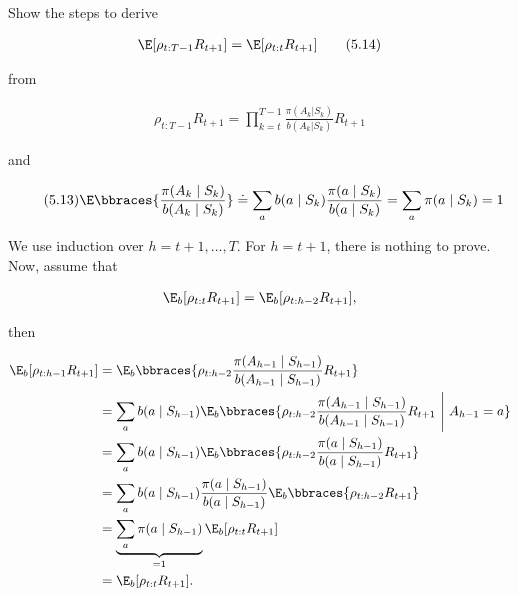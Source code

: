 
\begin{exercise}[Exercise 5.13]

Show the steps to derive

\begin{align*}
    \E[\rho_{t:T-1}R_{t+1}] = \E[\rho_{t:t}R_{t+1}] \tag{5.14}
\end{align*}

from

\begin{align*}
    \rho_{t:T-1}R_{t+1} = \prod_{k=t}^{T-1}\frac{\pi(A_k|S_k)}{b(A_k|S_k)}R_{t+1} \tag{5.12}
\end{align*}

and

\begin{align} \label{eq:5.13} \tag{5.13}
    \E\bbraces{\frac{\pi(A_k \mid S_k)}{b(A_k \mid S_k)}}
    \doteq \sum_a b(a \mid S_k) \frac{\pi(a \mid S_k)}{b(a \mid S_k)}
    = \sum_a \pi(a \mid S_k) = 1
\end{align}

\end{exercise}


\begin{solution}

We use induction over $h = t+1,\dots,T$.
For $h = t+1$, there is nothing to prove.
Now, assume that

\begin{align*}
    \E_b[\rho_{t:t} R_{t+1}]
    =
    \E_b[\rho_{t:h-2} R_{t+1}],
\end{align*}

then

\begin{align*}
    \E_b[\rho_{t:h-1} R_{t+1}]
    &= \E_b\bbraces{\rho_{t:h-2}
    \frac{\pi(A_{h-1} \mid S_{h-1})}{b(A_{h-1} \mid S_{h-1})}R_{t+1}} \\
    &= \sum_a b(a \mid S_{h-1})
    \E_b\bbraces{\rho_{t:h-2}\frac{\pi(A_{h-1} \mid S_{h-1})}
    {b(A_{h-1} \mid S_{h-1})}R_{t+1}~ \Bigg | ~ A_{h-1} = a} \\
    &= \sum_a b(a \mid S_{h-1}) \E_b\bbraces{
    \rho_{t:h-2}\frac{\pi(a \mid S_{h-1})}{b(a \mid S_{h-1})}R_{t+1}} \\            
    &= \sum_a b(a \mid S_{h-1})\frac{\pi(a \mid S_{h-1})}{b(a \mid S_{h-1})}
    \E_b\bbraces{\rho_{t:h-2}R_{t+1}} \\
    &= \underbrace{\sum_a \pi(a \mid S_{h-1})}_{=1}
    \E_b[\rho_{t:t} R_{t+1}] \\
    &= \E_b[\rho_{t:t} R_{t+1}].
\end{align*}

\end{solution}

